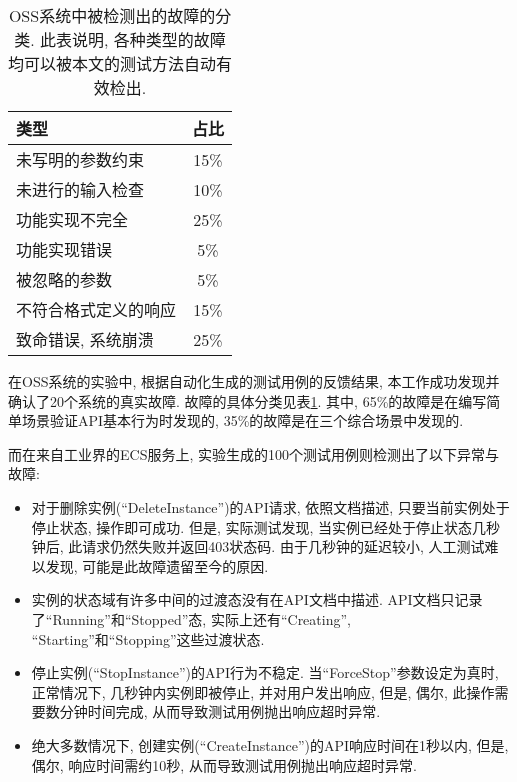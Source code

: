             \begin{table}[!htb]
                \centering
                \begin{tabular}{lc}
                    \toprule
                    类型 & 占比 \\
                    \midrule
                    未写明的参数约束 & 15\% \\
                    未进行的输入检查 & 10\% \\
                    功能实现不完全 & 25\% \\
                    功能实现错误 & 5\% \\
                    被忽略的参数 & 5\% \\
                    不符合格式定义的响应 & 15\% \\
                    致命错误, 系统崩溃 & 25\% \\
                    \bottomrule
                \end{tabular}
                \caption[OSS系统中被检测出的故障的分类表]{OSS系统中被检测出的故障的分类. 此表说明, 各种类型的故障均可以被本文的测试方法自动有效检出.}
                \label{tab:oss_bug_classification}
            \end{table}
            
            在OSS系统的实验中, 根据自动化生成的测试用例的反馈结果, 本工作成功发现并确认了20个系统的真实故障. 故障的具体分类见表\ref{tab:oss_bug_classification}. 其中, 65\%的故障是在编写简单场景验证API基本行为时发现的, 35\%的故障是在三个综合场景中发现的.
            
            而在来自工业界的ECS服务上, 实验生成的100个测试用例则检测出了以下异常与故障:
            \begin{itemize}
                \item 对于删除实例(“DeleteInstance”)的API请求, 依照文档描述, 只要当前实例处于停止状态, 操作即可成功. 但是, 实际测试发现, 当实例已经处于停止状态几秒钟后, 此请求仍然失败并返回403状态码. 由于几秒钟的延迟较小, 人工测试难以发现, 可能是此故障遗留至今的原因.
                
                \item 实例的状态域有许多中间的过渡态没有在API文档中描述. API文档只记录了“Running”和“Stopped”态, 实际上还有“Creating”, “Starting”和“Stopping”这些过渡状态.
                
                \item 停止实例(“StopInstance”)的API行为不稳定. 当“ForceStop”参数设定为真时, 正常情况下, 几秒钟内实例即被停止, 并对用户发出响应, 但是, 偶尔, 此操作需要数分钟时间完成, 从而导致测试用例抛出响应超时异常.
                
                \item 绝大多数情况下, 创建实例(“CreateInstance”)的API响应时间在1秒以内, 但是, 偶尔, 响应时间需约10秒, 从而导致测试用例抛出响应超时异常.
            \end{itemize}
            
